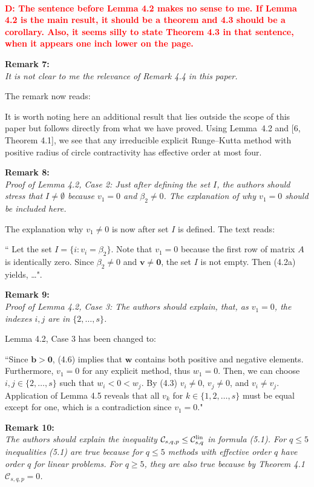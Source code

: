 \documentclass[12pt]{article}
\newcommand{\remark}[2]{\vspace{25pt} \noindent \textbf{Remark #1:\newline} \textit{#2}\vspace{15pt}}
\renewcommand{\newline}{\vspace{15pt}\\}
\newcommand{\sspcoef}{\mathcal{C}}
\newcommand{\clin}{\sspcoef^{\textnormal{lin}}_{s,q}}
\newcommand{\david}[1]{\textcolor{red}{\\\textbf{D: \footnotesize #1}\\}}
\begin{document}
\david{The sentence before Lemma 4.2 makes no sense to me.  If Lemma 4.2 is the main 
result, it should be a theorem and 4.3 should be a corollary.  Also, it seems silly to state
Theorem 4.3 in that sentence, when it appears one inch lower on the page.
}

\remark{7}{
It is not clear to me the relevance of Remark 4.4 in this paper.}

The remark now reads:

        It is worth noting here an additional result that lies outside the scope of
        this paper but follows directly from what we have proved.
	Using Lemma~4.2 and [6, Theorem 4.1],
  	we see that any irreducible explicit Runge--Kutta method with positive radius of
  	circle contractivity has effective order at most four.

\remark{8}{
Proof of Lemma 4.2, Case 2: Just after defining the set $I$, the authors should stress that
$I \neq \emptyset$ because $v_1 = 0$ and $\beta_2 \neq 0$.
The explanation of why $v_1 = 0$ should be included
here.}

The explanation why $v_1 \neq 0$ is now after set $I$ is defined. The text reads:

``	Let the set $I = \{i : v_i = \beta_2\}$. 
Note that $v_1 = 0$ because the first row of matrix $A$ is identically zero.
Since $\beta_2 \neq 0$ and $ \bm{v} \neq \bm{0}$, the set $I$ is not empty.
Then (4.2a) yields, \dots".
	
\remark{9}{
Proof of Lemma 4.2, Case 3: The authors should explain, that, as $v_1 = 0$, the 
indexes $i,j$ are in $\{2,\dots,s\}$.}

Lemma 4.2, Case 3 has been changed to:

``Since $\bm{b} > \bm{0}$, (4.6) implies that $\bm{w}$ contains both positive 
and negative elements. 
Furthermore, $v_1=0$ for any explicit method, thus $w_1=0$.
Then, we can choose $i, j \in \{2, \dots, s\}$ such that $w_i < 0 < w_j$.
By (4.3) $v_i\ne 0$, $v_j\ne 0$, and $v_i\ne v_j$.
Application of Lemma 4.5 reveals that all $v_k$ for 
$k \in\{1,2,\dots,s\}$ must be equal except for one, which is a contradiction
since $v_1 = 0$."

\remark{10}{
The authors should explain the inequality $\sspcoef_{s,q,p} \leq \clin$ in formula (5.1). 
For $q \leq 5$ inequalities (5.1) are true because for $q \leq 5$ methods with effective 
order $q$ have order $q$ for linear problems. 
For $q \geq 5$, they are also true because by Theorem 4.1 $\sspcoef_{s,q,p}  = 0$.}
\end{document}
